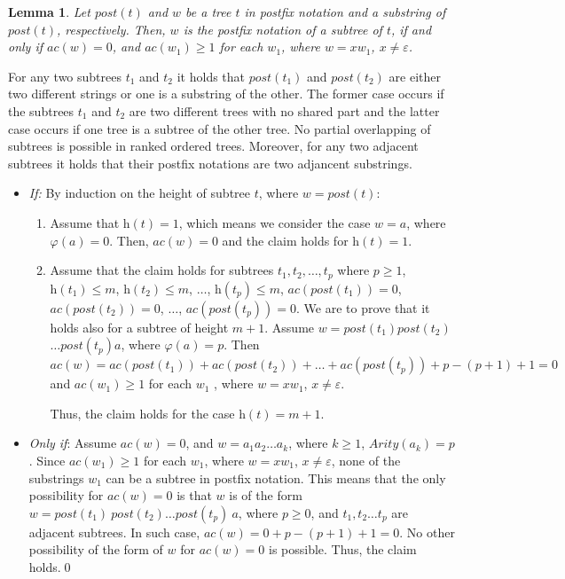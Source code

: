 \documentclass[preprint,12pt]{elsarticle}
\newtheorem{lemma}[theorem]{Lemma}
\newenvironment{proof}[1][Proof]{\begin{trivlist}
\item[\hskip \labelsep {\bfseries #1}]}{\end{trivlist}}
\begin{document}
\begin{lemma}
\label{lem 3}
Let $\textit{post}(t)$ and $w$ be a tree $t$ in postfix notation and a substring
of $\textit{post}(t)$, respectively. Then, $w$ is the postfix notation of a
subtree of $t$, if and only if $ac(w)=0$, and $ac(w_1) \geq 1$ for each $w_1$,
where $w=x w_1$, $x \neq \varepsilon$.
\end{lemma}
\begin{proof}
For any two subtrees $t_1$ and $t_2$ it holds that
$\textit{post}(t_1)$ and $\textit{post}(t_2)$ are either two different
strings or one is a substring of the other. The former case occurs if the
subtrees $t_1$ and $t_2$ are two different trees with no shared part and the
latter case occurs if one tree is a subtree of the other tree. No partial
overlapping of subtrees is possible in ranked ordered trees. Moreover, for any
two adjacent subtrees it holds that their postfix notations are two
adjancent substrings.

\begin{itemize}
\item \emph{If:}
By induction on the height of subtree $t$, where $w=\textit{post}(t)$:
\begin{enumerate}
\item Assume that $\textit{h}(t)=1$, which means we consider the case
$w=a$, where $\varphi(a) = 0$. Then, $\textit{ac}(w)=0$ and the
claim holds for $\textit{h}(t)=1$.
\item Assume that the claim holds for subtrees $t_1, t_2, \ldots ,t_p$
where $p \geq 1$, $\textit{h}(t_1)\leq m$, $\textit{h}(t_2)\leq m$,
$\ldots$, $\textit{h}(t_p)\leq m$, $\textit{ac}(\textit{post}(t_1))=0$,
$\textit{ac}(\textit{post}(t_2))=0$, $\ldots$, $\textit{ac}(\textit{post}(t_p))=0$.
We are to prove that it holds also for a subtree  of height $m+1$. Assume 
$w=\textit{post}(t_1)\textit{post}(t_2)$\\$\ldots \textit{post}(t_p)a$, where
$\varphi(a)=p$. Then $\textit{ac}(w) = \textit{ac}(\textit{post}(t_1)) 
+ \textit{ac}(\textit{post}(t_2)) + \ldots + \textit{ac}(\textit{post}(t_p)) + p - 
(p + 1) + 1 = 0$ and $\textit{ac}(w_1) \geq 1$ for each $w_1$ , where $w=x w_1$,
$x \neq \varepsilon$.

Thus, the claim holds for the case $\textit{h}(t)=m+1$.
\end{enumerate}

\item
\emph{Only if}:
Assume $\textit{ac}(w)=0$, and $w = a_1 a_2 \ldots a_k$, where $k \geq 1$,
$\textit{Arity}(a_k)=p$. Since $\textit{ac}(w_1) \geq 1$ for each $w_1$, where
$w=x w_1$, $x \neq \varepsilon $, none of the substrings $w_1$ can be a subtree
in postfix notation. This means that the only possibility for $ac(w)=0$ is that
$w$ is of the form $w=\textit{post}(t_1)\ \textit{post}(t_2) \ldots 
\textit{post}(t_p)\ a$, where $p \geq 0$, and $t_1, t_2 \ldots t_p$ are
adjacent subtrees. In such case, $\textit{ac}(w)=0 + p -(p+1)+1=0$.
No other possibility of the form of $w$ for $\textit{ac}(w)=0$ is possible.
Thus, the claim holds.\qed
\end{itemize}
\end{proof}
\end{document}
